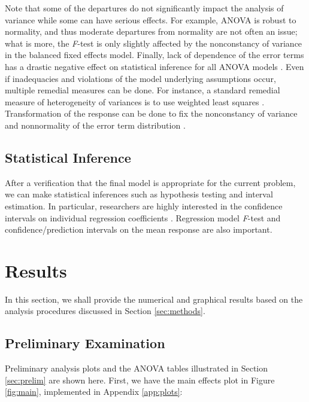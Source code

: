 \documentclass[11pt]{article}
\begin{document}
Note that some of the departures do not significantly impact the analysis of variance while some can have serious effects. For example, ANOVA is robust to normality, and thus moderate departures from normality are not often an issue; what is more, the \textit{F}-test is only slightly affected by the nonconstancy of variance in the balanced fixed effects model. Finally, lack of dependence of the error terms has a drastic negative effect on statistical inference for all ANOVA models \cite{bk:dae1, bk:dae2}. Even if inadequacies and violations of the model underlying assumptions occur, multiple remedial measures can be done. For instance, a standard remedial measure of heterogeneity of variances is to use weighted least squares \cite{bk:dae1}. Transformation of the response can be done to fix the nonconstancy of variance and nonnormality of the error term distribution \cite{bk:dae1, bk:dae2}.

\subsection{Statistical Inference}\label{sec:si}
After a verification that the final model is appropriate for the current problem, we can make statistical inferences such as hypothesis testing and interval estimation. In particular, researchers are highly interested in the confidence intervals on individual regression coefficients \cite{bk:dae1, bk:ilra}. Regression model \textit{F}-test and confidence/prediction intervals on the mean response are also important.

\section{Results}\label{sec:results}
In this section, we shall provide the numerical and graphical results based on the analysis procedures discussed in Section \ref{sec:methods}.

\subsection{Preliminary Examination}
Preliminary analysis plots and the ANOVA tables illustrated in Section \ref{sec:prelim} are shown here. First, we have the main effects plot in Figure \ref{fig:main}, implemented in Appendix \ref{app:plots}:
\end{document}
